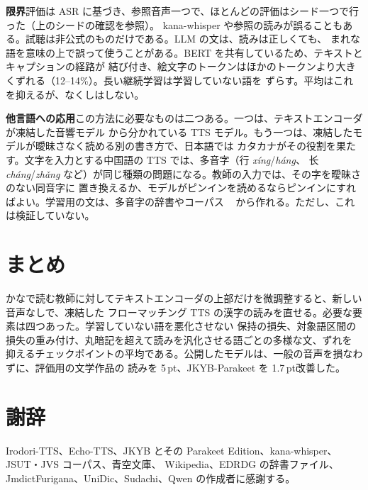 \documentclass[10pt,a4paper,twocolumn]{article}
\newcommand{\pt}{\,pt}
\begin{document}
\textbf{限界}\quad 評価は ASR に基づき、参照音声一つで、ほとんどの評価はシード一つで行った（上のシードの確認を参照）。
kana-whisper や参照の読みが誤ることもある。試聴は非公式のものだけである。LLM の文は、読みは正しくても、
まれな語を意味の上で誤って使うことがある。BERT を共有しているため、テキストとキャプションの経路が
結び付き、絵文字のトークンはほかのトークンより大きくずれる（12--14\%）。長い継続学習は学習していない語を
ずらす。平均はこれを抑えるが、なくしはしない。

\textbf{他言語への応用}\quad この方法に必要なものは二つある。一つは、テキストエンコーダが凍結した音響モデル
から分かれている TTS モデル。もう一つは、凍結したモデルが曖昧さなく読める別の書き方で、日本語では
カタカナがその役割を果たす。文字を入力とする中国語の TTS では、多音字（行 \emph{xíng}/\emph{háng}、
长 \emph{cháng}/\emph{zhǎng} など）が同じ種類の問題になる。教師の入力では、その字を曖昧さのない同音字に
置き換えるか、モデルがピンインを読めるならピンインにすればよい。学習用の文は、多音字の辞書やコーパス
~\cite{g2pm} から作れる。ただし、これは検証していない。

\section{まとめ}
かなで読む教師に対してテキストエンコーダの上部だけを微調整すると、新しい音声なしで、凍結した
フローマッチング TTS の漢字の読みを直せる。必要な要素は四つあった。学習していない語を悪化させない
保持の損失、対象語区間の損失の重み付け、丸暗記を超えて読みを汎化させる語ごとの多様な文、ずれを
抑えるチェックポイントの平均である。公開したモデルは、一般の音声を損なわずに、評価用の文学作品の
読みを 5\pt、JKYB-Parakeet を 1.7\pt 改善した。

\section*{謝辞}
Irodori-TTS、Echo-TTS、JKYB とその Parakeet Edition、kana-whisper、JSUT・JVS コーパス、青空文庫、
Wikipedia、EDRDG の辞書ファイル、JmdictFurigana、UniDic、Sudachi、Qwen の作成者に感謝する。
\end{document}
